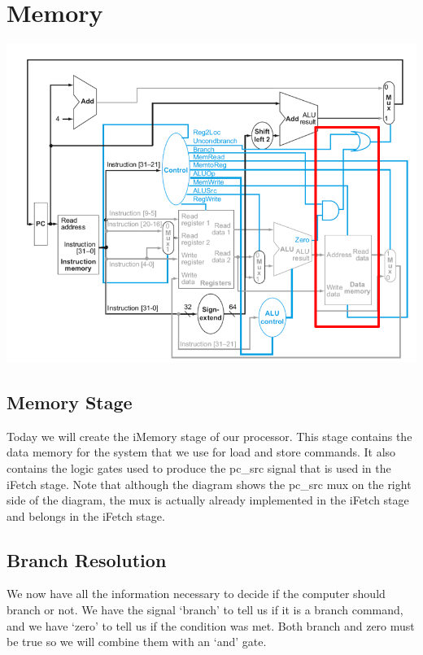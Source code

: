\chapter{Memory}

\begin{center}
\includegraphics[width=5.5in]{../images/data_memory.png}
\end{center}

\section{Memory Stage}
Today we will create the iMemory stage of our processor.  This stage contains the data memory for the system that we use for load and store commands.  It also contains the logic gates used to produce the pc\_src signal that is used in the iFetch stage.  Note that although the diagram shows the pc\_src mux on the right side of the diagram, the mux is actually already implemented in the iFetch stage and belongs in the iFetch stage.

\section{Branch Resolution}

We now have all the information necessary to decide if the computer should branch or not.  We have the signal `branch' to tell us if it is a branch command, and we have `zero' to tell us if the condition was met.  Both branch and zero must be true so we will combine them with an `and' gate.

